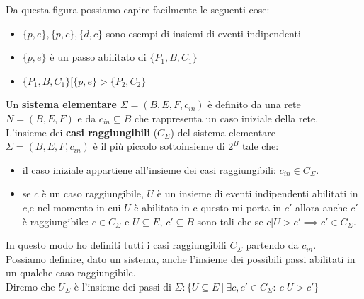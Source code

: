 Da questa figura possiamo capire facilmente le seguenti cose:
\begin{itemize}
    \item $\{p,e\},\{p,c\},\{d,c\}$ sono esempi di insiemi di eventi indipendenti
    \item $\{p,e\}$ è un passo abilitato di $\{P_1,B,C_1\}$
    \item $\{P_1,B,C_1\}[\{p,e\} >\{P_2,C_2\} $
\end{itemize}

Un \textbf{sistema elementare} $\Sigma = (B,E,F, c_{in})$ è definito da una rete $N = (B, E , F)$ e da $c_{in} \subseteq B$ che rappresenta un caso iniziale della rete. \\
L'insieme dei \textbf{casi raggiungibili} ($C_{\Sigma}$) del sistema elementare $\Sigma = (B,E,F, c_{in})$ è il più piccolo sottoinsieme di $2^B$ tale che:
\begin{itemize}
    \item il caso iniziale appartiene all'insieme dei casi raggiungibili: $c_{in} \in C_{\Sigma}$.
    \item se $c$ è un caso raggiungibile, $U$ è un insieme di eventi indipendenti abilitati in $c$,e nel momento in cui $U$ è abilitato in c questo mi porta in $c'$ allora anche $c'$ è raggiungibile: $c \in C_{\Sigma}$ e $U \subseteq E$, $c' \subseteq B$ sono tali che se $c[U > c' \implies c' \in C_{\Sigma}$. 
\end{itemize}
In questo modo ho definiti tutti i casi raggiungibili $C_{\Sigma}$ partendo da $c_{in}$.\\

Possiamo definire, dato un sistema, anche l'insieme dei possibili passi abilitati in un qualche caso raggiungibile. \\ Diremo che $U_{\Sigma}$ è l'insieme dei passi di $\Sigma : \{U \subseteq E \ | \ \exists c,c'\in C_{\Sigma}: \ c[U >c' \}$

